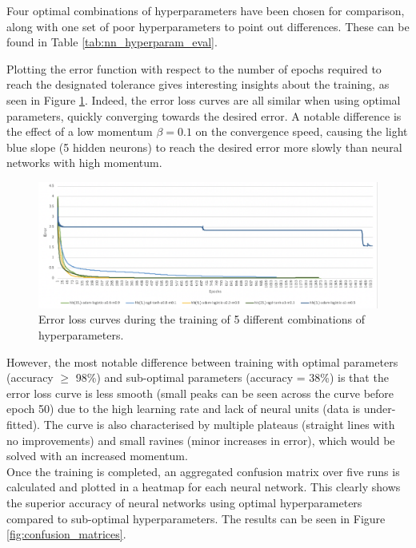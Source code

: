 \documentclass[letterpaper,12pt]{article}
\begin{document}
Four optimal combinations of hyperparameters have been chosen for comparison, along with one set of poor hyperparameters to point out differences. These can be found in Table \ref{tab:nn_hyperparam_eval}.



Plotting the error function with respect to the number of epochs required to reach the designated tolerance gives interesting insights about the training, as seen in Figure \ref{fig:error-loss-curve}. Indeed, the error loss curves are all similar when using optimal parameters, quickly converging towards the desired error. A notable difference is the effect of a low momentum $\beta=0.1$ on the convergence speed, causing the light blue slope (5 hidden neurons) to reach the desired error more slowly than neural networks with high momentum.

\begin{figure}[h] 
\centerline{\includegraphics[width=\textwidth]{report/figures/error_loss_curve.png}}
\caption{\label{fig:error-loss-curve}Error loss curves during the training of 5 different combinations of hyperparameters.}
\end{figure}

However, the most notable difference between training with optimal parameters (accuracy $\geqslant$ 98\%) and sub-optimal parameters (accuracy = 38\%) is that the error loss curve is less smooth (small peaks can be seen across the curve before epoch 50) due to the high learning rate and lack of neural units (data is under-fitted). The curve is also characterised by multiple plateaus (straight lines with no improvements) and small ravines (minor increases in error), which would be solved with an increased momentum.\\

Once the training is completed, an aggregated confusion matrix over five runs is calculated and plotted in a heatmap for each neural network. This clearly shows the superior accuracy of neural networks using optimal hyperparameters compared to sub-optimal hyperparameters. The results can be seen in Figure \ref{fig:confusion_matrices}.
\end{document}
